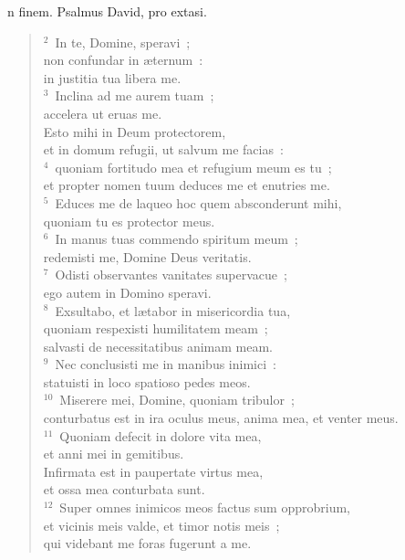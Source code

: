 \bchapter
{}n finem. Psalmus David, pro extasi.
\begin{flushleft}\begin{verse}\vspace{6pt}${}^{2}$~In te, Domine, speravi~;\\ non confundar in \ae ternum~:\\ in justitia tua libera me.\\
${}^{3}$~Inclina ad me aurem tuam~;\\ accelera ut eruas me.\\ Esto mihi in Deum protectorem,\\ et in domum refugii, ut salvum me facias~:\\
${}^{4}$~quoniam fortitudo mea et refugium meum es tu~;\\ et propter nomen tuum deduces me et enutries me.\\
${}^{5}$~Educes me de laqueo hoc quem absconderunt mihi,\\ quoniam tu es protector meus.\\
${}^{6}$~In manus tuas commendo spiritum meum~;\\ redemisti me, Domine Deus veritatis.\\
${}^{7}$~Odisti observantes vanitates supervacue~;\\ ego autem in Domino speravi.\\
${}^{8}$~Exsultabo, et l\ae tabor in misericordia tua,\\ quoniam respexisti humilitatem meam~;\\ salvasti de necessitatibus animam meam.\\
${}^{9}$~Nec conclusisti me in manibus inimici~:\\ statuisti in loco spatioso pedes meos.\\
${}^{10}$~Miserere mei, Domine, quoniam tribulor~;\\ conturbatus est in ira oculus meus, anima mea, et venter meus.\\
${}^{11}$~Quoniam defecit in dolore vita mea,\\ et anni mei in gemitibus.\\ Infirmata est in paupertate virtus mea,\\ et ossa mea conturbata sunt.\\
${}^{12}$~Super omnes inimicos meos factus sum opprobrium,\\ et vicinis meis valde, et timor notis meis~;\\ qui videbant me foras fugerunt a me.\\

\end{verse}
\end{flushleft}
